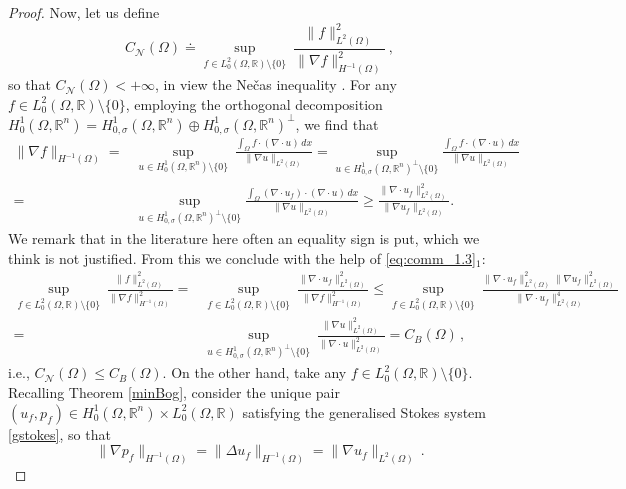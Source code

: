\documentclass[11pt]{article}
\theoremstyle{plain}
\theoremstyle{definition}
\numberwithin{equation}{section}
\newcommand{\R}{\mathbb{R}}
\begin{document}
\begin{proof}
Now, let us define
\begin{equation} \label{necasconstant}
C_{\mathcal{N}}(\Omega) \doteq \sup_{f\in L^2_0(\Omega,\R)\setminus \{0\}}\ \frac{\|  f\|_{L^2(\Omega)}^2}{\| \nabla f\|_{H^{-1}(\Omega)}^2} \, ,
\end{equation}
so that $C_{\mathcal{N}}(\Omega) < +\infty$, in view the Ne\v{c}as inequality \cite{Necas_ineq}. For any $f\in L^2_0 (\Omega,\R)\setminus \{0\}$, employing the orthogonal decomposition $H^1_0(\Omega,\R^n)=H^1_{0,\sigma}(\Omega,\R^n)\oplus H^1_{0,\sigma}(\Omega,\R^n)^\perp$, we find that
\begin{align*}
\| \nabla f\|_{H^{-1}(\Omega)}=&\sup_{u\in H^1_0(\Omega,\R^n)\setminus \{0\}}\
\frac{\int_\Omega f\cdot(\nabla \cdot u) \, dx}{\|\nabla u\|_{L^2(\Omega)}}
	=\sup_{u\in H^1_{0,\sigma}(\Omega,\R^n)^\perp\setminus \{0\}}\frac{\int_\Omega f\cdot(\nabla \cdot u) \, dx}{\|\nabla u\|_{L^2(\Omega)}}\\[6pt]
	=& \sup_{u\in H^1_{0,\sigma}(\Omega,\R^n)^\perp\setminus \{0\}}\frac{\int_\Omega (\nabla\cdot u_f)\cdot(\nabla \cdot u) \, dx}
{\|\nabla u\|_{L^2(\Omega)}}
	\geq \frac{\|\nabla\cdot u_f\|^2_{L^2(\Omega)}}{\|\nabla u_f\|_{L^2(\Omega)}}.
\end{align*}
We remark that in the literature here often an equality sign is put, which we think is not justified.
From this we conclude with the help of \eqref{eq:comm_1.3}$_1$:
\begin{align*}
\sup_{f\in L^2_0 (\Omega,\R)\setminus \{0\}} \ \frac{\|  f\|_{L^2(\Omega)}^2}{\| \nabla f\|_{H^{-1}(\Omega)}^2}=&
\sup_{f\in L^2_0 (\Omega,\R)\setminus \{0\}} \ \frac{\|  \nabla\cdot u_f\|_{L^2(\Omega)}^2}{\| \nabla f\|_{H^{-1}(\Omega)}^2}
	\leq \sup_{f\in L^2_0 (\Omega,\R)\setminus \{0\}} \ \frac{\|  \nabla\cdot u_f\|_{L^2(\Omega)}^2  \|\nabla u_f\|_{L^2(\Omega)}^2}{\| \nabla \cdot u_f\|_{L^2(\Omega)}^4}\\[6pt]
	=&\sup_{u\in H^1_{0,\sigma}(\Omega,\R^n)^\perp\setminus \{0\}} \ \frac{\|\nabla u\|_{L^2(\Omega)}^2}{\| \nabla \cdot u\|_{L^2(\Omega)}^2}
	=C_B(\Omega) \, ,
\end{align*}
i.e., $C_{\mathcal{N}}(\Omega) \leq C_B(\Omega)$. On the other hand, take any $f\in L^2_0 (\Omega,\R) \setminus \{0\}$. Recalling Theorem \ref{minBog}, consider the unique pair $(u_{f}, p_{f}) \in H^1_{0}(\Omega,\R^n) \times L^{2}_{0}(\Omega,\R)$ satisfying the generalised Stokes system \eqref{gstokes}, so that
\begin{equation} \label{pressureandvel}
\| \nabla p_{f} \|_{H^{-1}(\Omega)} = \| \Delta u_{f} \|_{H^{-1}(\Omega)} = \| \nabla u_{f} \|_{L^{2}(\Omega)} \, .

\end{equation}
\end{proof}
\end{document}
